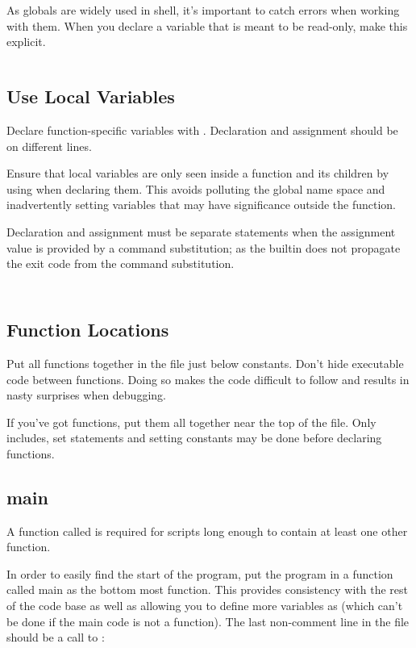 \documentclass{article}
\begin{document}
As globals are widely used in shell, it’s important to catch errors when working with them. When you declare a variable that is meant to be read-only, make this explicit.

\inputminted[frame=single,firstline=446, lastline=451, linenos]{bash}{./styleguide.bash}

\subsection{Use Local Variables}
\label{subsec:loc_vars}
Declare function-specific variables with . Declaration and assignment should be on different lines.

Ensure that local variables are only seen inside a function and its children by using  when declaring them. This avoids polluting the global name space and inadvertently setting variables that may have significance outside the function.

Declaration and assignment must be separate statements when the assignment value is provided by a command substitution; as the  builtin does not propagate the exit code from the command substitution.

\inputminted[frame=single,firstline=453, lastline=462, linenos]{bash}{./styleguide.bash}

\inputminted[frame=single,firstline=464, lastline=471, linenos]{bash}{./styleguide.bash}

\subsection{Function Locations}
\label{subsec:func_loc}
Put all functions together in the file just below constants. Don’t hide executable code between functions. Doing so makes the code difficult to follow and results in nasty surprises when debugging.

If you’ve got functions, put them all together near the top of the file. Only includes, set statements and setting constants may be done before declaring functions.

\subsection{main}
\label{subsec:main}
A function called  is required for scripts long enough to contain at least one other function.

In order to easily find the start of the program, put the  program in a function called main as the bottom most function. This provides consistency with the rest of the code base as well as allowing you to define more variables as  (which can’t be done if the main code is not a function). The last non-comment line in the file should be a call to :
\end{document}
